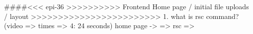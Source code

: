 
####<<< epi-36 >>>>>>>>>> Frontend Home page / initial file uploads / layout >>>>>>>>>>>>>>>>>>>>>>>>
   1. what is rsc command? (video => times => 4: 24 seconds)
      home page -> 
      => rsc => 


